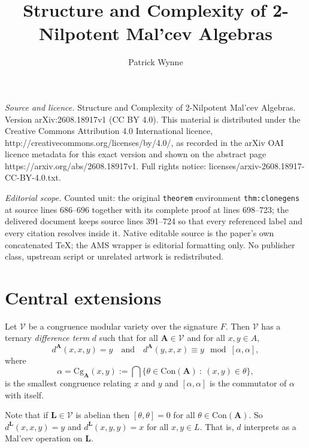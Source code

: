 \documentclass[10pt,a4paper]{amsart}
\numberwithin{equation}{section}
\newcommand{\st}{\ :\ }
\newcommand{\A}{\mathbf{A}}
\renewcommand{\L}{\mathbf{L}}
\newcommand{\V}{\mathcal{V}}
\newcommand{\Con}{\mathrm{Con}}
\newcommand{\Cg}{\mathrm{Cg}}
\begin{document}
\title[Structure and Complexity of 2-Nilpotent Mal'cev Algebras]{Structure and Complexity of 2-Nilpotent Mal'cev Algebras}
\author{Patrick Wynne}
\date{}
\maketitle
\noindent\emph{Source and licence.} Structure and Complexity of 2-Nilpotent Mal'cev Algebras. Version arXiv:2608.18917v1 (CC BY 4.0). This material is distributed under the Creative Commons Attribution 4.0 International licence, http://creativecommons.org/licenses/by/4.0/, as recorded in the arXiv OAI licence metadata for this exact version and shown on the abstract page https://arxiv.org/abs/2608.18917v1. Full rights notice: licenses/arxiv-2608.18917-CC-BY-4.0.txt.\par\smallskip
\noindent\textit{Editorial scope.} Counted unit: the original \texttt{theorem} environment \texttt{thm:clonegens} at source lines 686--696 together with its complete proof at lines 698--723; the delivered document keeps source lines 391--724 so that every referenced label and every citation resolves inside it. Native editable source is the paper's own concatenated TeX; the AMS wrapper is editorial formatting only. No publisher class, upstream script or unrelated artwork is redistributed.
\section{Central extensions} 
\label{sec:centralextensions}

Let $\V$ be a congruence modular variety over the signature $F$. 
Then $\V$ has a ternary \emph{difference term} $d$ 
  such that for all $\A\in \V$ and for all $x,y\in A$,
  \[ d^\A(x,x,y) = y  \quad \text{and} \quad  d^\A(y,x,x) \equiv y \mod [\alpha,\alpha], \]
  where
  \[ \alpha = \Cg_\A(x,y) := \bigcap \{\theta \in \Con(\A) \st (x,y) \in \theta\},\]
  is the smallest congruence relating $x$ and $y$ and $[\alpha,\alpha]$ is the commutator 
  of $\alpha$ with itself. 

Note that if $\L \in \V$ is abelian then $[\theta, \theta] = 0$ for all $\theta \in \Con(\A)$.
So $d^\L(x,x,y) = y$ and $d^\L(x,y,y) = x$ for all $x,y \in L.$ 
That is, $d$ interprets as a Mal'cev operation on $\L$. 
 
\end{document}
